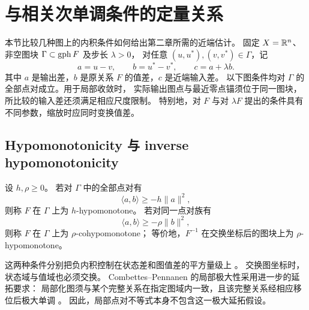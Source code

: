 \section{与相关次单调条件的定量关系}
\label{sec:comparison}

本节比较几种图上的内积条件如何给出第二章所需的近端估计。
固定 $X=\mathbb R^n$、非空图块 $\Gamma\subset\operatorname{gph} F$ 及步长 $\lambda>0$，
对任意 $(u,u^*),(v,v^*)\in\Gamma$，记
\[
 a=u-v,\qquad b=u^*-v^*,\qquad c=a+\lambda b.
\]
其中 $a$ 是输出差，$b$ 是原关系 $F$ 的值差，$c$ 是近端输入差。
以下图条件均对 $\Gamma$ 的全部点对成立。用于局部收敛时，
实际输出图点与最近零点锚须位于同一图块，
所比较的输入差还须满足相应尺度限制。
特别地，对 $F$ 与对 $\lambda F$ 提出的条件具有不同参数，缩放时应同时变换值差。

\subsection{Hypomonotonicity 与 inverse hypomonotonicity}
\label{subsec:hypomonotonicity}

\begin{definition}[原图与逆图的二次缺陷]
\label{def:hypomonotonicity}
设 $h,\rho\ge0$。
若对 $\Gamma$ 中的全部点对有
\begin{equation}
 \langle a,b\rangle\ge-h\|a\|^2,
 \label{eq:hypomonotonicity}
\end{equation}
则称 $F$ 在 $\Gamma$ 上为 $h$-hypomonotone。
若对同一点对族有
\begin{equation}
 \langle a,b\rangle\ge-\rho\|b\|^2,
 \label{eq:inverse-hypomonotonicity}
\end{equation}
则称 $F$ 在 $\Gamma$ 上为 $\rho$-cohypo\allowbreak monotone；
等价地，$F^{-1}$ 在交换坐标后的图块上为 $\rho$-hypo\allowbreak monotone。
\end{definition}

这两种条件分别把负内积控制在状态差和图值差的平方量级上
\cite[Definition~3]{LukeTam2025GeneralizedMonotonicity}。
交换图坐标时，状态域与值域也必须交换。
Combettes--Pennanen 的局部极大性采用进一步的延拓要求：
局部化图须与某个完整关系在指定图域内一致，且该完整关系经相应移位后极大单调
\cite[Definitions~2.1--2.2]{CombettesPennanen2004Cohypomonotone}。
因此，局部点对不等式本身不包含这一极大延拓假设。

